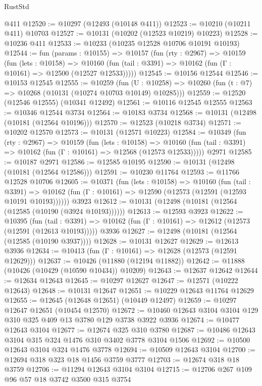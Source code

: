 \begin{lexlean}{RustStd}
\begin{coremodule}
    @411
@12520 := @10297 (@12493 (@10148 @411))
@12523 := @10210 (@10211 @411) @10703
@12527 := @10131 (@10202 (@12523 @10219) @10223)
@12528 := @10236 @411
@12533 := @10233 (@10235 @12528 @10706 @10191 @10193)
@12544 := fun (params : @10155) =>
  @10157
    (fun (rty : @2967) =>
    @10159
      (fun (lets : @10158) =>
      @10160 (fun (tail : @3391) => @10162 (fun (Γ : @10161) => @12500 (@12527 @12533)))))
@12545 := @10156 @12544
@12546 := @10153 @12545
@12555 := @10259
    (fun (U : @10258) => @10260 (fun (t : @7) => @10268 (@10131 (@10274 @10703 @10149) @10285)))
@12559 := @12520 (@12546 @12555) (@10341 @12492)
@12561 := @10116 @12545 @12555
@12563 := @10346 @12544 @3734
@12564 := @10183 @3734
@12568 := @10131 (@12498 (@10181 (@12564 @10196)))
@12570 := @12523 (@10218 @3734)
@12571 := @10202 @12570
@12573 := @10131 (@12571 @10223)
@12584 := @10349
    (fun (rty : @2967) =>
    @10159
      (fun (lets : @10158) =>
      @10160 (fun (tail : @3391) => @10162 (fun (Γ : @10161) => @12568 (@12573 @12533)))))
    @2971
@12585 := @10187 @2971
@12586 := @12585 @10195
@12590 := @10131 (@12498 (@10181 (@12564 @12586)))
@12591 := @10230 @11764
@12593 := @11766 @12528 @10706
@12605 := @10371
    (fun (lets : @10158) =>
    @10160
      (fun (tail : @3391) =>
      @10162 (fun (Γ : @10161) => @12590 (@12573 (@12591 (@12593 @10191 @10193))))))
    @3923
@12612 := @10131 (@12498 (@10181 (@12564 (@12585 (@10190 (@3924 @10193))))))
@12613 := @12593 @3923
@12622 := @10395
    (fun (tail : @3391) => @10162 (fun (Γ : @10161) => @12612 (@12573 (@12591 (@12613 @10193)))))
    @3936
@12627 := @12498 (@10181 (@12564 (@12585 (@10190 @3937))))
@12628 := @10131 @12627
@12629 := @12613 @3936
@12634 := @10413 (fun (Γ : @10161) => @12628 (@12573 (@12591 @12629)))
@12637 := @10426 (@11880 (@12194 @11882))
@12642 := @11888 (@10426 (@10429 (@10590 @10434)) @10209)
@12643 := @12637 @12642
@12644 := @12634 @12643
@12645 := @10297 @12627
@12647 := @12571 (@10222 @12643)
@12648 := @10131 @12647
@12651 := @10229 @12643 @11764 @12629
@12655 := @12645 (@12648 @12651) (@10449 @12497)
@12659 := @10297 @12647 @12651 (@10454 @12570)
@12672 := @10460 @12643 @3104 @3104 @129 @310 @325 @409 @13 @3780 @129 @3738 @3922 @3936
@12674 := @10477 @12643 @3104
@12677 := @12674 @325 @310 @3780
@12687 := @10486 @12643 @3104 @315 @324 @1476 @310 @3402 @3778 @3104 @1506
@12692 := @10500 @12643 @3104 @324 @1476 @3778
@12694 := @10509 @12643 @3104
@12700 := @12694 @318 @323 @18 @1456 @3759 @3777
@12703 := @12674 @318 @18 @3759
@12706 := @11294 @12643 @3104 @3104
@12715 := @12706 @267 @109 @96 @57 @18 @3742 @3500 @315 @3754

\end{coremodule}
\end{lexlean}
